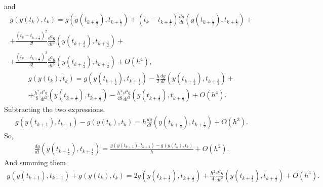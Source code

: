 \documentclass[letterpaper,10pt,english]{jupyterBook}
\begin{document}
\sphinxAtStartPar
and
\begin{equation*}
\begin{split}
    g(y(t_k), t_k) = g\left(y\left(t_{k+\frac{1}{2}}\right), t_{k+\frac{1}{2}}\right) +
    \left(t_k - t_{k+\frac{1}{2}}\right) \frac{dg}{dt} \left(y\left(t_{k+\frac{1}{2}}\right), t_{k+\frac{1}{2}}\right) + \\
    + \frac{\left(t_k - t_{k+\frac{1}{2}}\right)^2}{2!} \frac{d^2g}{dt^2} \left(y\left(t_{k+\frac{1}{2}}\right), t_{k+\frac{1}{2}}\right) + \\
    + \frac{\left(t_k - t_{k+\frac{1}{2}}\right)^3}{3!} \frac{d^3g}{dt^3} \left(y\left(t_{k+\frac{1}{2}}\right), t_{k+\frac{1}{2}}\right)
    + O(h^4),
\end{split}
\end{equation*}\begin{equation*}
\begin{split}
    g(y(t_k), t_k) = g\left(y\left(t_{k+\frac{1}{2}}\right), t_{k+\frac{1}{2}}\right) -
    \frac{h}{2} \frac{dg}{dt} \left(y\left(t_{k+\frac{1}{2}}\right), t_{k+\frac{1}{2}}\right) + \\
    + \frac{h^2}{8} \frac{d^2g}{dt^2} \left(y\left(t_{k+\frac{1}{2}}\right), t_{k+\frac{1}{2}}\right)
    - \frac{h^3}{48} \frac{d^3g}{dt^3} \left(y\left(t_{k+\frac{1}{2}}\right), t_{k+\frac{1}{2}}\right)
    + O(h^4).
\end{split}
\end{equation*}
\sphinxAtStartPar
Subtracting the two expressions,
\begin{equation*}
\begin{split}
  g(y(t_{k+1}), t_{k+1}) - g(y(t_k), t_k) = h \frac{dg}{dt} \left(y\left(t_{k+\frac{1}{2}}\right), t_{k+\frac{1}{2}}\right) + O(h^3).
\end{split}
\end{equation*}
\sphinxAtStartPar
So,
\begin{equation*}
\begin{split}
  \frac{dg}{dt} \left(y\left(t_{k+\frac{1}{2}}\right), t_{k+\frac{1}{2}}\right) = \frac{g(y(t_{k+1}), t_{k+1}) - g(y(t_k), t_k)}{h} + O(h^2).
\end{split}
\end{equation*}
\sphinxAtStartPar
And summing them
\begin{equation*}
\begin{split}
  g(y(t_{k+1}), t_{k+1}) + g(y(t_k), t_k) =
  2 g\left(y\left(t_{k+\frac{1}{2}}\right), t_{k+\frac{1}{2}}\right)
  + \frac{h^2}{4} \frac{d^2g}{dt^2} \left(y\left(t_{k+\frac{1}{2}}\right), t_{k+\frac{1}{2}}\right) + O(h^4).
\end{split}
\end{equation*}
\end{document}
